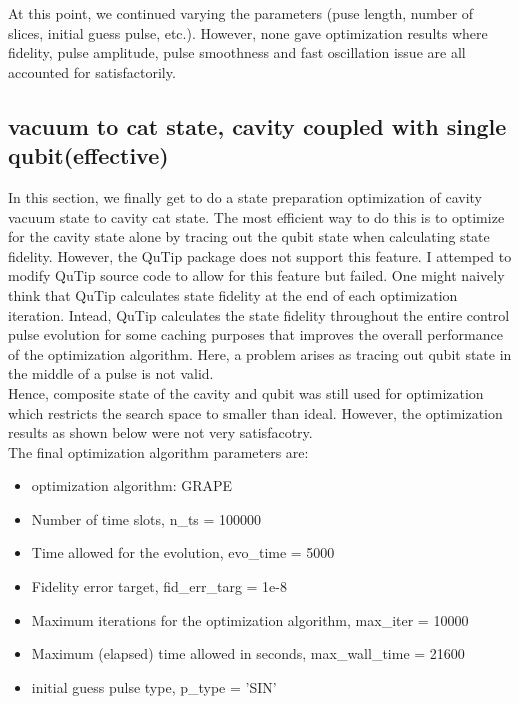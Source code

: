 \documentclass[12pt]{article}
\begin{document}
At this point, we continued varying the parameters (puse length, number of slices, initial guess pulse, etc.). 
However, none gave optimization results where fidelity, pulse amplitude, pulse smoothness and fast oscillation issue 
are all accounted for satisfactorily. 

\subsection{vacuum to cat state, cavity coupled with single qubit(effective)}
In this section, we finally get to do a state preparation optimization of cavity vacuum state to cavity cat state.
The most efficient way to do this is to optimize for the cavity state alone by tracing out the qubit state when calculating state fidelity. 
However, the QuTip package does not support this feature. I attemped to modify QuTip source code to allow for this feature but failed. 
One might naively think that QuTip calculates state fidelity at the end of each optimization iteration. 
Intead, QuTip calculates the state fidelity throughout the entire control pulse evolution for some caching purposes that improves the overall performance of the optimization algorithm. 
Here, a problem arises as tracing out qubit state in the middle of a pulse is not valid. 
\\
Hence, composite state of the cavity and qubit was still used for optimization which restricts the search space to smaller than ideal. 
However, the optimization results as shown below were not very satisfacotry. 
\\
The final optimization algorithm parameters are:
\\ 
\begin{itemize}
    \item optimization algorithm: GRAPE
    \item Number of time slots, n\_ts = 100000
    \item Time allowed for the evolution, evo\_time = 5000
    \item Fidelity error target, fid\_err\_targ = 1e-8
    \item Maximum iterations for the optimization algorithm, max\_iter = 10000
    \item Maximum (elapsed) time allowed in seconds, max\_wall\_time = 21600
    \item initial guess pulse type, p\_type = 'SIN'
\end{itemize}
\end{document}

